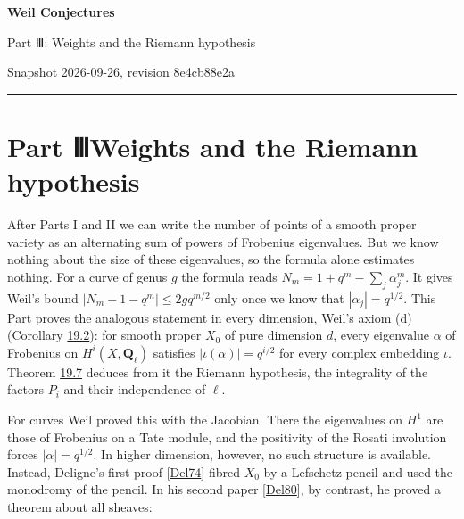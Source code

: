 \documentclass[11pt]{article}
\begin{document}
\pagestyle{plain}
\begin{center}
{\LARGE\bfseries Weil Conjectures\par}
\vspace{0.7em}
{\large Part Ⅲ: Weights and the Riemann hypothesis\par}
\vspace{0.5em}
{\small\color{bpmuted}Snapshot 2026-09-26, revision 8e4cb88e2a\par}
\end{center}
\vspace{0.5em}
{\small\tableofcontents}
\bigskip\hrule\bigskip

\part*{\texorpdfstring{Part Ⅲ\quad Weights and the Riemann hypothesis}{Part Ⅲ Weights and the Riemann hypothesis}}
\label{bp1}%
\label{bp2}%
After Parts I and II we can write the number of points of a smooth proper variety as an alternating sum of powers of Frobenius eigenvalues. But we know nothing about the size of these eigenvalues, so the formula alone estimates nothing. For a curve of genus \(g\) the formula reads \(N_m=1+q^m-\sum_j\alpha_j^m\). It gives Weil's bound \(|N_m-1-q^m|\le2gq^{m/2}\) only once we know that \(|\alpha_j|=q^{1/2}\). This Part proves the analogous statement in every dimension, Weil's axiom (d) (Corollary \hyperref[bp326]{19.2}): for smooth proper \(X_0\) of pure dimension \(d\), every eigenvalue \(\alpha\) of Frobenius on \(H^i(X,\mathbf Q_\ell)\) satisfies \(|\iota(\alpha)|=q^{i/2}\) for every complex embedding \(\iota\). Theorem \hyperref[bp342]{19.7} deduces from it the Riemann hypothesis, the integrality of the factors \(P_i\) and their independence of \(\ell\).

For curves Weil proved this with the Jacobian. There the eigenvalues on \(H^1\) are those of Frobenius on a Tate module, and the positivity of the Rosati involution forces \(|\alpha|=q^{1/2}\). In higher dimension, however, no such structure is available. Instead, Deligne's first proof [\hyperref[bp350]{Del74}] fibred \(X_0\) by a Lefschetz pencil and used the monodromy of the pencil. In his second paper [\hyperref[bp351]{Del80}], by contrast, he proved a theorem about all sheaves:
\end{document}
